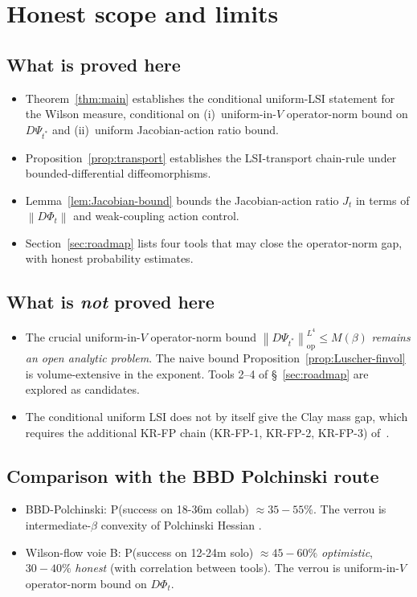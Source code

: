 \documentclass[11pt,a4paper]{amsart}
\theoremstyle{definition}
\newcommand{\norm}[1]{\left\lVert#1\right\rVert}
\begin{document}
\section{Honest scope and limits}\label{sec:remark}

\subsection{What is proved here}
\begin{itemize}[leftmargin=2em]
\item Theorem~\ref{thm:main} establishes the conditional uniform-LSI
statement for the Wilson measure, conditional on
(i)~uniform-in-$V$ operator-norm bound on $D\Psi_{t^*}$ and
(ii)~uniform Jacobian-action ratio bound.
\item Proposition~\ref{prop:transport} establishes the LSI-transport
chain-rule under bounded-differential diffeomorphisms.
\item Lemma~\ref{lem:Jacobian-bound} bounds the Jacobian-action ratio
$J_t$ in terms of $\norm{D\Phi_t}$ and weak-coupling action control.
\item Section~\ref{sec:roadmap} lists four tools that may close the
operator-norm gap, with honest probability estimates.
\end{itemize}

\subsection{What is \emph{not} proved here}
\begin{itemize}[leftmargin=2em]
\item The crucial uniform-in-$V$ operator-norm bound
$\norm{D\Psi_{t^*}}_\mathrm{op}^{L^4} \leq M(\beta)$
\emph{remains an open analytic problem}. The naive bound
Proposition~\ref{prop:Luscher-finvol} is volume-extensive in the
exponent. Tools 2--4 of \S~\ref{sec:roadmap} are explored as
candidates.
\item The conditional uniform LSI does not by itself give the Clay mass
gap, which requires the additional KR-FP chain
(KR-FP-1, KR-FP-2, KR-FP-3) of~\cite{RemondiereKRFP3_2026,
RemondiereKRFPB_2026}.
\end{itemize}

\subsection{Comparison with the BBD Polchinski route}
\begin{itemize}[leftmargin=2em]
\item BBD-Polchinski: P(success on 18-36m collab) $\approx 35-55\%$.
The verrou is intermediate-$\beta$ convexity of Polchinski Hessian
\cite[(H1a-iii)]{OpusPolchinskiSubgaps2026}.
\item Wilson-flow voie B: P(success on 12-24m solo) $\approx 45-60\%$
\emph{optimistic}, $30-40\%$ \emph{honest} (with correlation between
tools). The verrou is uniform-in-$V$ operator-norm bound on $D\Phi_t$.
\end{itemize}
\end{document}
